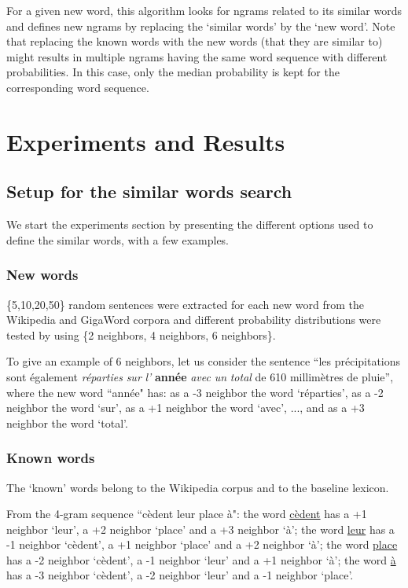 \documentclass[conference]{IEEEtran}
\begin{document}
For a given new word, this algorithm looks for ngrams related to its similar words and defines new ngrams by replacing the `similar words' by the `new word'.
Note that replacing the known words with the new words (that they are similar to) might results in multiple ngrams having the same word sequence with different probabilities. In this case, only the median probability is kept for the corresponding word sequence.

\section{Experiments and Results}

\subsection{Setup for the similar words search}

We start the experiments section by presenting the different options used to define the similar words, with a few examples. 

\subsubsection{New words}

\{5,10,20,50\} random sentences were extracted for each new word from the Wikipedia and GigaWord corpora and different probability distributions were tested by using \{2 neighbors, 4 neighbors, 6 neighbors\}.

To give an example of 6 neighbors, let us consider the sentence 
``les précipitations sont également \textit{réparties} \textit{sur} \textit{l'} \textbf{année} \textit{avec} \textit{un} \textit{total} de 610 millimètres de pluie'', where the new word ``année" has: 
as a -3 neighbor the word  `réparties', 
as a -2 neighbor the word  `sur', 
as a +1 neighbor the word  `avec', 
..., 
and as a +3 neighbor the word  `total'.

\subsubsection{Known words}

The `known' words belong to the Wikipedia corpus and to the baseline lexicon.
 
From the 4-gram sequence ``cèdent leur place à":
the word \underline{cèdent} has a +1 neighbor `leur', a +2 neighbor `place' and a +3 neighbor `à';
the word \underline{leur} has a -1 neighbor `cèdent', a +1 neighbor `place' and a +2 neighbor `à';
the word \underline{place} has a -2 neighbor `cèdent', a -1 neighbor `leur' and a +1 neighbor `à';
the word \underline{à} has a -3 neighbor `cèdent', a -2 neighbor `leur' and a -1 neighbor `place'.
\end{document}
